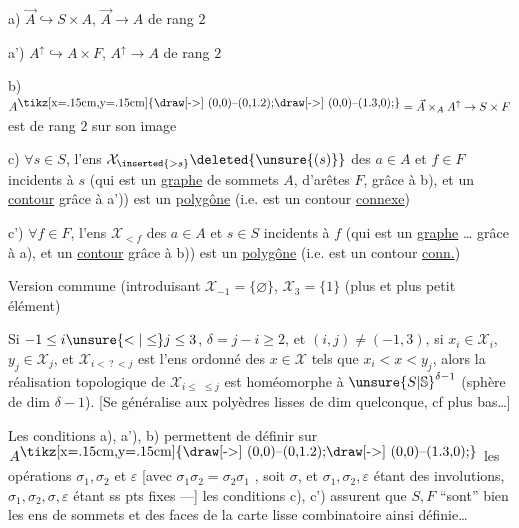 a) $\vec A\hookrightarrow S\times A$,  $\vec A\to A$ de rang $2$

a') $A^\uparrow\hookrightarrow A\times F$, \quad $A^\uparrow\to A$ de rang $2$


b) $A^{\vcenter{\hbox{\tikz[x=.15cm,y=.15cm]{\draw[->] (0,0)--(0,1.2);\draw[->] (0,0)--(1.3,0);}}}}=\vec A\times_A A^\uparrow\to S\times F$ est de rang $2$ sur son image

c) $\forall s\in S$, l'ens $\mathcal X_{\inserted{>s}}\deleted{\unsure{(s)}}$ des $a\in A$ et $f\in F$
incidents à $s$ (qui est un \uline{graphe} de
sommets $A$, d'arêtes $F$, grâce à b), et
\unsure{$=$|$\subset$|$\simeq$} un \uline{contour} grâce à a')) est un
\uline{polygône} (i.e. est un contour \inserted{$\ne\varnothing$} \uline{connexe})

c') $\forall f\in F$, l'ens $\mathcal X_{<f}$ des $a\in A$ et $s\in S$
incidents à $f$ (qui est un \uline{graphe} \ldots{}
grâce à a), et un \uline{contour} grâce à b))
est un \uline{polygône} (i.e. est un contour \inserted{$\ne\varnothing$} \uline{conn.})

Version commune (introduisant $\mathcal X_{-1}=\{\varnothing\}$, $\mathcal X_3=\{1\}$ (plus 
et plus petit élément)

Si $-1\leq i\unsure{<|\leq}j\leq3$,  $\delta=j-i\geq2$, et  $(i,j)\ne(-1,3)$, si $x_i\in\mathcal X_i$, $y_j\in\mathcal X_j$,
et $\mathcal X_{i<\,?\,<j}$ est l'ens ordonné des $x\in\mathcal X$ \deleted{$\unsure{<}$} tels que
$x_i<x<y_j$, alors la réalisation topologique de $\mathcal X_{i\leq\,\,\leq j}$ est
homéomorphe à \deleted{$\unsure{\Sigma}$} $\unsure{S|\mathbb S}^{\delta-1}$ (sphère de dim $\delta-1$). [Se
généralise aux polyèdres lisses de dim quelconque, cf plus
bas\ldots]

Les conditions a), a'), b) permettent de définir sur
$A^{\vcenter{\hbox{\tikz[x=.15cm,y=.15cm]{\draw[->] (0,0)--(0,1.2);\draw[->] (0,0)--(1.3,0);}}}}$ les opérations $\sigma_1,\sigma_2$ et $\varepsilon$ [avec $\sigma_1\sigma_2=\sigma_2\sigma_1$ , soit $\sigma$,
et $\sigma_1,\sigma_2,\varepsilon$ étant des involutions, $\sigma_1,\sigma_2,\sigma,\varepsilon$ étant ss
pts fixes ---] les conditions c), c') assurent que
$S,F$ ``sont'' bien les ens de sommets et des faces de la
carte lisse combinatoire ainsi définie\ldots
